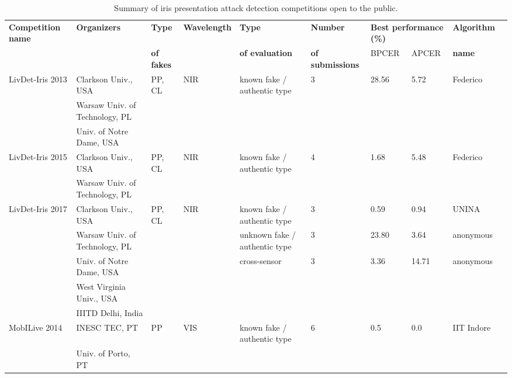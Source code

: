 \documentclass[format=acmsmall, review=false, timestamp=false]{acmart}
\begin{document}
\begin{landscape}
\begin{table}[htb!]
    \begin{center}
        \caption{Summary of iris presentation attack detection competitions open to the public.}
        \label{tab:Competitions}
        \tiny
        \vspace{0.5cm}
        \begin{threeparttable}
        \begin{tabular}{llllllllll}
            {\bf Competition name}
            & {\bf Organizers}
            & {\bf Type}        
            &{\bf  Wavelength}
            & {\bf Type}
            & {\bf Number}
            & \multicolumn{2}{l}{{\bf Best performance (\%)\tnote{1}}}
            & {\bf Algorithm} 
            \\
            & & {\bf of fakes} & & {\bf of evaluation} & {\bf of submissions} & BPCER & APCER & {\bf name}\\
            \hline
            \hline
	    LivDet-Iris 2013 \cite{Yambay_IJCB_2014} & Clarkson Univ., USA & PP, CL & NIR & known {fake} / {authentic} type & 3 & 28.56 & 5.72 & Federico \\
	    & Warsaw Univ. of Technology, PL & & & & & & &\\   
	    & Univ. of Notre Dame, USA & & & & & & & \\\hline
	    LivDet-Iris 2015 \cite{Yambay_ISBA_2017} & Clarkson Univ., USA & PP, CL & NIR & known {fake} / {authentic} type & 4 & 1.68 & 5.48 & Federico \\
	    & Warsaw Univ. of Technology, PL & & & & & & & \\\hline
	    LivDet-Iris 2017 \cite{Yambay_IJCB_2017}  & Clarkson Univ., USA & PP, CL & NIR & known {fake} / {authentic} type & 3 & 0.59 & 0.94 & UNINA \\
	    & Warsaw Univ. of Technology, PL & & & unknown {fake} / {authentic} type & 3 & 23.80 & 3.64 & anonymous \\
	    &Univ. of Notre Dame, USA  & & & cross-sensor & 3 & 3.36 & 14.71 & anonymous \\
	    & West Virginia Univ., USA & & & & & & & \\
	    & IIITD Delhi, India & & & & & & & \\\hline
	    MobILive 2014 \cite{Sequeira_IJCB_2014}  & INESC TEC, PT & PP & VIS & known {fake} / {authentic} type & 6 & 0.5 & 0.0 & IIT Indore \\
	    & Univ. of Porto, PT & & & & & & & \\

\end{tabular}
\end{threeparttable}
\end{center}
\end{table}
\end{landscape}
\end{document}

